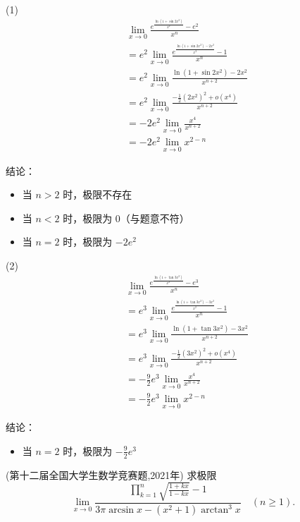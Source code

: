 \documentclass[12pt, a4paper, oneside, UTF8]{ctexbook}
\begin{document}
\begin{solution}
\item[(1)]
\begin{align*}
&\lim_{x \to 0} \frac{e^{\frac{\ln(1 + \sin 2x^2)}{x^2}} - e^2}{x^n} \\
&= e^2 \lim_{x \to 0} \frac{e^{\frac{\ln(1 + \sin 2x^2) - 2x^2}{x^2}} - 1}{x^n} \\
&= e^2 \lim_{x \to 0} \frac{\ln(1 + \sin 2x^2) - 2x^2}{x^{n+2}} \\
&= e^2 \lim_{x \to 0} \frac{-\frac{1}{2}(2x^2)^2 + o(x^4)}{x^{n+2}} \\
&= -2e^2 \lim_{x \to 0} \frac{x^4}{x^{n+2}} \\
&= -2e^2 \lim_{x \to 0} x^{2-n}
\end{align*}

结论：
\begin{itemize}
\item 当 $n > 2$ 时，极限不存在
\item 当 $n < 2$ 时，极限为 $0$（与题意不符）
\item 当 $n = 2$ 时，极限为 $-2e^2$
\end{itemize}

\item[(2)]
\begin{align*}
&\lim_{x \to 0} \frac{e^{\frac{\ln(1 + \tan 3x^2)}{x^2}} - e^3}{x^n} \\
&= e^3 \lim_{x \to 0} \frac{e^{\frac{\ln(1 + \tan 3x^2) - 3x^2}{x^2}} - 1}{x^n} \\
&= e^3 \lim_{x \to 0} \frac{\ln(1 + \tan 3x^2) - 3x^2}{x^{n+2}} \\
&= e^3 \lim_{x \to 0} \frac{-\frac{1}{2}(3x^2)^2 + o(x^4)}{x^{n+2}} \\
&= -\frac{9}{2}e^3 \lim_{x \to 0} \frac{x^4}{x^{n+2}} \\
&= -\frac{9}{2}e^3 \lim_{x \to 0} x^{2-n}
\end{align*}

结论：
\begin{itemize}
\item 当 $n = 2$ 时，极限为 $-\frac{9}{2}e^3$
\end{itemize}
\end{solution}


\begin{example}(第十二届全国大学生数学竞赛题,2021年)
求极限
$$
\lim\limits_{x\to 0}\frac{\prod\limits_{k=1}^{n}\sqrt{\frac{1+kx}{1-kx}}-1}{3\pi\arcsin x-(x^{2}+1)\arctan^{3}x} \quad (n\geqslant 1).
$$
\end{example}
\end{document}
